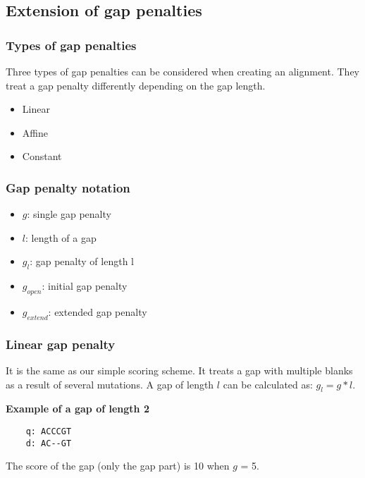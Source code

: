 %
%

%
%
\subsection{Extension of gap penalties}

%
%
\subsubsection*{Types of gap penalties}
Three types of gap penalties can be considered when creating an alignment. They treat a gap penalty differently depending on the gap length.

\begin{itemize}
\item Linear
\item Affine
\item Constant
\end{itemize}

%
%
\subsubsection*{Gap penalty notation}
\begin{itemize}
\item $g$: single gap penalty
\item $l$: length of a gap
\item $g_l$: gap penalty of length l
\item $g_{open}$: initial gap penalty
\item $g_{extend}$: extended gap penalty
\end{itemize}

%
%
\subsubsection*{Linear gap penalty}
It is the same as our simple scoring scheme. It treats a gap with multiple blanks as a result of several mutations. A gap of length $l$ can be calculated as: $g_l = g * l$.
\medskip 

\noindent
\textbf{Example of a gap of length 2}
\begin{verbatim}
    q: ACCCGT
    d: AC--GT
\end{verbatim}
The score of the gap (only the gap part) is 10 when $g$ = 5. 

